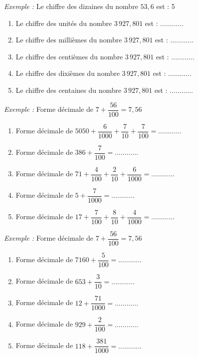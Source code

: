 \documentclass[11pt]{article}
\begin{document}
\phantom{0}


\begin{exercicedevoir}
\textit{Exemple :} Le chiffre des dizaines du nombre $53{,}6$ est : 5
\begin{enumerate}
\item Le chiffre des unités du nombre $3\,927{,}801$ est : $\ldots\ldots\ldots\ldots$
\item Le chiffre des millièmes du nombre $3\,927{,}801$ est : $\ldots\ldots\ldots\ldots$
\item Le chiffre des centièmes du nombre $3\,927{,}801$ est : $\ldots\ldots\ldots\ldots$
\item Le chiffre des dixièmes du nombre $3\,927{,}801$ est : $\ldots\ldots\ldots\ldots$
\item Le chiffre des centaines du nombre $3\,927{,}801$ est : $\ldots\ldots\ldots\ldots$
\end{enumerate}
\end{exercicedevoir}

\begin{exercicedevoir}
\textit{Exemple :} Forme décimale de $7 + \dfrac{56}{100} =7,56$
\begin{enumerate}
\item Forme décimale de $5050 + \dfrac{6}{1000} + \dfrac{7}{10} + \dfrac{7}{100}=\ldots\ldots\ldots\ldots$
\item Forme décimale de $386 + \dfrac{7}{100}=\ldots\ldots\ldots\ldots$
\item Forme décimale de $71 + \dfrac{4}{100} + \dfrac{2}{10} + \dfrac{6}{1000}=\ldots\ldots\ldots\ldots$
\item Forme décimale de $5 + \dfrac{7}{1000}=\ldots\ldots\ldots\ldots$
\item Forme décimale de $17 + \dfrac{7}{100} + \dfrac{8}{10} + \dfrac{4}{1000}=\ldots\ldots\ldots\ldots$
\end{enumerate}
\end{exercicedevoir}

\begin{exercicedevoir}
\textit{Exemple :} Forme décimale de $7 + \dfrac{56}{100} =7,56$
\begin{enumerate}
\item Forme décimale de $7160 + \dfrac{5}{100} =\ldots\ldots\ldots\ldots$
\item Forme décimale de $653 + \dfrac{3}{10}=\ldots\ldots\ldots\ldots$
\item Forme décimale de $12 + \dfrac{71}{1000}=\ldots\ldots\ldots\ldots$
\item Forme décimale de $929 + \dfrac{2}{100}=\ldots\ldots\ldots\ldots$
\item Forme décimale de $118 + \dfrac{381}{1000}=\ldots\ldots\ldots\ldots$
\end{enumerate}
\end{exercicedevoir}
\end{document}

